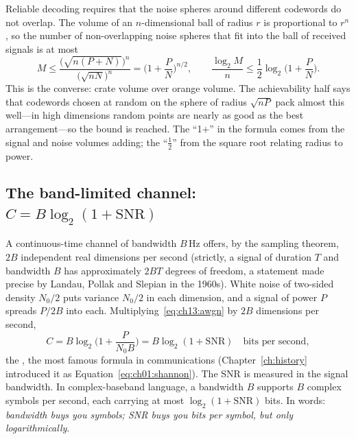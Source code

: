 
Reliable decoding requires that the noise spheres around different codewords do not overlap. The
volume of an $n$-dimensional ball of radius $r$ is proportional to $r^n$, so the number of
non-overlapping noise spheres that fit into the ball of received signals is at most
\begin{equation}
M\le\frac{\big(\sqrt{n(P+N)}\big)^n}{\big(\sqrt{nN}\big)^n}=\Big(1+\frac PN\Big)^{n/2},
\qquad
\frac{\log_2M}{n}\le\frac12\log_2\!\Big(1+\frac PN\Big).
\label{eq:ch13:spheres}
\end{equation}
This is the converse: crate volume over orange volume. The achievability half says that codewords
chosen at random on the sphere of radius $\sqrt{nP}$ pack almost this well---in high dimensions
random points are nearly as good as the best arrangement---so the bound is reached. The ``1+'' in
the formula comes from the signal and noise volumes adding; the ``$\frac12$'' from the square root
relating radius to power.

\subsection{The band-limited channel: $C=B\log_2(1+\mathrm{SNR})$}

A continuous-time channel of bandwidth $B$\,Hz offers, by the sampling theorem, $2B$ independent
real dimensions per second (strictly, a signal of duration $T$ and bandwidth $B$ has approximately
$2BT$ degrees of freedom, a statement made precise by Landau, Pollak and Slepian in the 1960s).
White noise of two-sided density $N_0/2$ puts variance $N_0/2$ in each dimension, and a signal of
power $P$ spreads $P/2B$ into each. Multiplying~\eqref{eq:ch13:awgn} by $2B$ dimensions per second,
\begin{equation}
C=B\log_2\!\Big(1+\frac{P}{N_0B}\Big)=B\log_2(1+\mathrm{SNR})\quad\text{bits per second},
\label{eq:ch13:shannonhartley}
\end{equation}
the , the most famous formula in communications
(Chapter~\ref{ch:history} introduced it as Equation~\eqref{eq:ch01:shannon}). The SNR is measured
in the signal bandwidth. In complex-baseband language, a bandwidth $B$ supports $B$ complex symbols
per second, each carrying at most $\log_2(1+\mathrm{SNR})$ bits. In words: \emph{bandwidth buys
you symbols; SNR buys you bits per symbol, but only logarithmically}.

